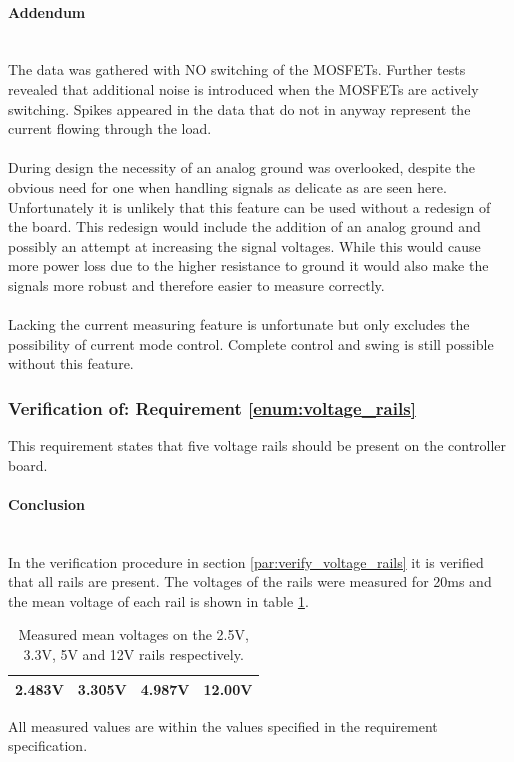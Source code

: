 \paragraph{Addendum}~\\
The data was gathered with NO switching of the MOSFETs.
Further tests revealed that additional noise is introduced when the MOSFETs are actively switching.
Spikes appeared in the data that do not in anyway represent the current flowing through the load.
\\~\\
During design the necessity of an analog ground was overlooked, despite the obvious need for one when handling signals as delicate as are seen here.
Unfortunately it is unlikely that this feature can be used without a redesign of the board.
This redesign would include the addition of an analog ground and possibly an attempt at increasing the signal voltages.
While this would cause more power loss due to the higher resistance to ground it would also make the signals more robust and therefore easier to measure correctly.
\\~\\
Lacking the current measuring feature is unfortunate but only excludes the possibility of current mode control.
Complete control and swing is still possible without this feature.

\subsubsection{Verification of: Requirement \ref{enum:voltage_rails}} %
\label{ssub:requirement_enum:voltage_rails}
This requirement states that five voltage rails should be present on the controller board. 

\paragraph{Conclusion}~\\
In the verification procedure in section \ref{par:verify_voltage_rails} it is verified that all rails are present.
The voltages of the rails were measured for 20ms and the mean voltage of each rail is shown in table \ref{tab:meas_rails}.
\begin{table}[]
\centering
\begin{tabular}{|l|l|l|l|}
\hline
2.483V & 3.305V & 4.987V & 12.00V \\
\hline
\end{tabular}
\caption{Measured mean voltages on the 2.5V, 3.3V, 5V and 12V rails respectively.}
\label{tab:meas_rails}
\end{table}
All measured values are within the values specified in the requirement specification.


